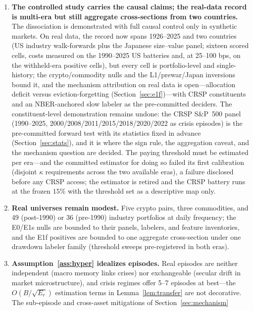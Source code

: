 \documentclass{article}
\begin{document}
\begin{enumerate}
    \item \textbf{The controlled study carries the causal claims; the
    real-data record is multi-era but still aggregate
    cross-sections from two countries.} The dissociation is demonstrated
    with full causal control only in synthetic markets. On real data,
    the record now spans 1926--2025 and two countries (US industry
    walk-forwards plus the Japanese size--value panel; sixteen scored
    cells, costs measured on the 1990--2025 US
    batteries and, at 25--100 bps, on the withheld-era positive
    cells), but every cell is portfolio-level and
    single-history; the
    crypto/commodity nulls and the L1/prewar/Japan inversions bound it, and
    the mechanism attribution on real data is open---allocation
    deficit versus eviction-forgetting
    (Section~\ref{sec:e1f})---with CRSP constituents and an
    NBER-anchored slow labeler as the pre-committed deciders. The
    constituent-level demonstration remains undone: the CRSP
    S\&P~500 panel (1990--2025, 2000/2008/2011/2015/2018/2020/2022 as
    crisis episodes) is the pre-committed forward test with its
    statistics fixed in advance (Section~\ref{sec:stats}), and it is
    where the sign rule, the aggregation caveat, and the mechanism
    question are decided. The paying threshold must be estimated per
    era---and the committed estimator for doing so failed its first
    calibration (disjoint $\kappa$ requirements across the two
    available eras), a failure disclosed before any CRSP access; the
    estimator is retired and the CRSP battery runs at the frozen
    $15\%$ with the threshold set as a descriptive map only.
    \item \textbf{Real universes remain modest.} Five crypto pairs,
    three commodities, and 49 (post-1990) or 36 (pre-1990) industry
    portfolios at daily frequency;
    the E0/E1s nulls are bounded to their panels, labelers, and feature
    inventories, and the E1f positives are bounded to one aggregate
    cross-section under one drawdown labeler family (threshold sweeps
    pre-registered in both eras).
    \item \textbf{Assumption~\ref{ass:hyper} idealizes episodes.} Real
    episodes are neither independent (macro memory links crises) nor
    exchangeable (secular drift in market microstructure), and crisis
    regimes offer 5--7 episodes at best---the $O(B/\sqrt{E_r})$
    estimation terms in Lemma~\ref{lem:transfer} are not decorative. The
    sub-episode and cross-asset mitigations of Section~\ref{sec:mechanism}

\end{enumerate}
\end{document}
